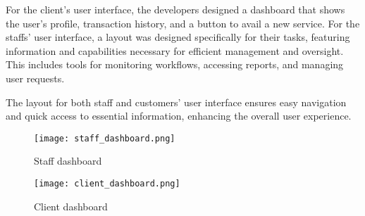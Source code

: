 For the client’s user interface, the developers designed a dashboard that shows the user’s profile, transaction history, and a button to avail a new service. For the staffs’ user interface, a layout was designed specifically for their tasks, featuring information and capabilities necessary for efficient management and oversight. This includes tools for monitoring workflows, accessing reports, and managing user requests.

The layout for both staff and customers’ user interface ensures easy navigation and quick access to essential information, enhancing the overall user experience.

\begin{figure}[h]
	\centering 
	\texttt{[image: staff\_dashboard.png]}
	\caption{Staff dashboard}
	\label{fig:staff_dashboard}
\end{figure}

\begin{figure}[h]
	\centering 
	\texttt{[image: client\_dashboard.png]}
	\caption{Client dashboard}
	\label{fig:client_dashboard}
\end{figure}

